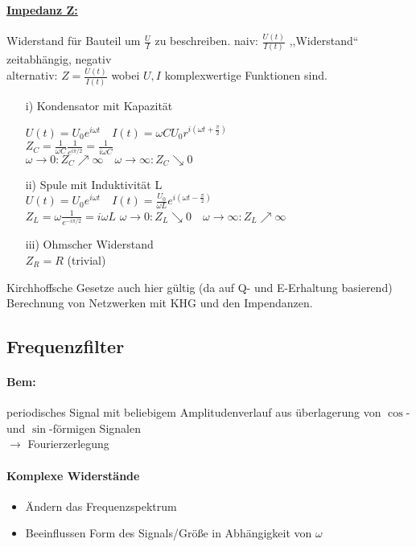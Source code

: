 \documentclass[titlepage,12pt,a4paper,ngerman]{report}
\begin{document}
\paragraph{\underline{Impedanz Z:}}
Widerstand für Bauteil um $ \frac{U}{I} $ zu beschreiben. naiv: $ \frac{U(t)}{I(t)} $ ,,Widerstand`` zeitabhängig, negativ\\
alternativ: $ \boxed{Z = \frac{U(t)}{I(t)}} $ wobei $ U,I $ komplexwertige Funktionen sind.
\begin{itemize}
	\item[i)] Kondensator mit Kapazität
	
	$ U(t) = U_0 e^{i \omega t} \quad I(t) = \omega C U_0 r ^{i(\omega t + \frac{\pi}{2})} $\\
	$ Z_C = \frac{1}{\omega C} \frac{1}{e^{i \pi/2}} = \frac{1}{i \omega C} $\\
	$ \omega \rightarrow 0: Z_C \nearrow \infty \quad \omega \rightarrow \infty : Z_C \searrow 0 $
	
	\item[ii)] Spule mit Induktivität L\\
	$ U(t) = U_0 e^{i\omega t} \quad I(t) = \frac{U_0}{\omega L} e^{i (\omega t - \frac{\pi}{2})} $\\
	$\boxed{Z_L = \omega \frac{1}{e^{-i \pi/2}} = i \omega L} $
	$ \omega \rightarrow 0 : Z_L \searrow 0 \quad \omega \rightarrow \infty: Z_L \nearrow \infty $
	\item [iii)] Ohmscher Widerstand\\
	$ Z_R = R  $ (trivial) \\
\end{itemize}
Kirchhoffsche Gesetze auch hier gültig (da auf Q- und E-Erhaltung basierend) Berechnung von Netzwerken mit KHG und den Impendanzen. 

\subsection{Frequenzfilter}
\paragraph{Bem:} periodisches Signal mit beliebigem Amplitudenverlauf aus überlagerung von $ \cos $- und $ \sin $-förmigen Signalen\\
$ \rightarrow $ Fourierzerlegung
\paragraph{Komplexe Widerstände}
\begin{itemize}
	\item Ändern das Frequenzspektrum
	\item Beeinflussen Form des Signals/Größe in Abhängigkeit von $ \omega $
\end{itemize}
\end{document}
